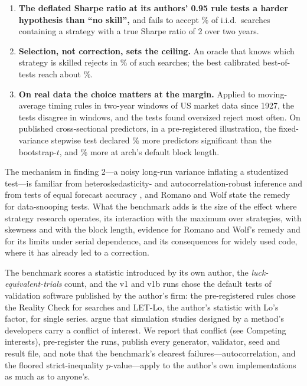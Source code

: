 \begin{enumerate}
  \item \textbf{The deflated Sharpe ratio at its authors' 0.95 rule tests a harder hypothesis than ``no skill'',} and fails to accept \% of i.i.d.\ searches containing a strategy with a true Sharpe ratio of 2 over two years.
  \item \textbf{Selection, not correction, sets the ceiling.} An oracle that knows which strategy is skilled rejects in \% of such searches; the best calibrated best-of- tests reach about \%.
  \item \textbf{On real data the choice matters at the margin.} Applied to  moving-average timing rules in  two-year windows of US market data since 1927, the tests disagree in  windows, and the tests found oversized reject most often. On published cross-sectional predictors, in a pre-registered illustration, the fixed-variance stepwise test declared \% more predictors significant than the bootstrap-$t$, and \% more at arch's default block length.
\end{enumerate}
The mechanism in finding 2---a noisy long-run variance inflating a studentized test---is familiar from heteroskedasticity- and autocorrelation-robust inference \citep{kiefer2005new,sun2008optimal,lazarus2018har} and from tests of equal forecast accuracy \citep{diebold1995comparing,harvey1997testing,coroneo2020comparing}, and Romano and Wolf state the remedy for data-snooping tests. What the benchmark adds is the size of the effect where strategy research operates, its interaction with the maximum over strategies, with skewness and with the block length, evidence for Romano and Wolf's remedy and for its limits under serial dependence, and its consequences for widely used code, where it has already led to a correction.

The benchmark scores a statistic introduced by its own author, the \emph{luck-equivalent-trials} count, and the v1 and v1b runs chose the default tests of validation software published by the author's firm: the pre-registered rules chose the Reality Check for searches and LET-Lo, the author's statistic with Lo's factor, for single series. \citet{bartos2025living} argue that simulation studies designed by a method's developers carry a conflict of interest. We report that conflict (see Competing interests), pre-register the runs, publish every generator, validator, seed and result file, and note that the benchmark's clearest failures---autocorrelation, and the floored strict-inequality $p$-value---apply to the author's own implementations as much as to anyone's.

